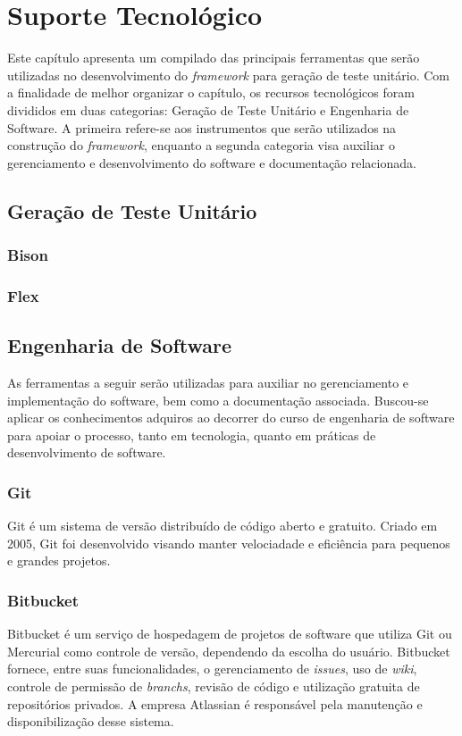 \chapter[Suporte Tecnológico]{Suporte Tecnológico}

Este capítulo apresenta um compilado das principais ferramentas que serão utilizadas no desenvolvimento do \textit{framework} para geração de teste unitário. Com a finalidade de melhor organizar o capítulo, os recursos tecnológicos foram divididos em duas categorias: Geração de Teste Unitário e Engenharia de Software. A primeira refere-se aos instrumentos que serão utilizados na construção do \textit{framework}, enquanto a segunda categoria visa auxiliar o gerenciamento e desenvolvimento do software e documentação relacionada.

\section{Geração de Teste Unitário}


\subsection{Bison}


\subsection{Flex}


\section{Engenharia de Software}

As ferramentas a seguir serão utilizadas para auxiliar no gerenciamento e implementação do software, bem como a documentação associada. Buscou-se aplicar os conhecimentos adquiros ao decorrer do curso de engenharia de software para apoiar o processo, tanto em tecnologia, quanto em práticas de desenvolvimento de software.

\subsection{Git}
Git é um sistema de versão distribuído de código aberto e gratuito. Criado em 2005, Git foi desenvolvido visando manter velociadade e eficiência para pequenos e grandes projetos. 

\subsection{Bitbucket}
Bitbucket é um serviço de hospedagem de projetos de software que utiliza Git ou Mercurial como controle de versão, dependendo da escolha do usuário. Bitbucket fornece, entre suas funcionalidades, o gerenciamento de \textit{issues}, uso de \textit{wiki}, controle de permissão de \textit{branchs}, revisão de código e utilização gratuita de repositórios privados. A empresa Atlassian é responsável pela manutenção e disponibilização desse sistema.

